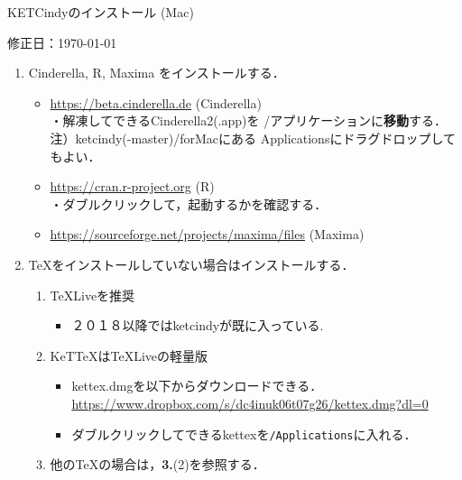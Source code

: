 \documentclass{ujarticle}
\begin{document}
\begin{center}
KETCindyのインストール (Mac)
\end{center}

\hfill 修正日：\today

\begin{enumerate}[\bf\large 1.]
\item Cinderella, R, Maxima をインストールする．
 \begin{itemize}
 \item \url{https://beta.cinderella.de}  (Cinderella)\\
\hspace*{1zw}・解凍してできるCinderella2(.app)を /アプリケーションに{\bf 移動}する．\\
\hspace*{2zw}注）ketcindy(-master)/forMacにある Applicationsにドラグドロップしてもよい．
 \item \url{https://cran.r-project.org}   (R)\\
\hspace*{1zw}・ダブルクリックして，起動するかを確認する．
 \item \url{https://sourceforge.net/projects/maxima/files}  (Maxima)%
 \end{itemize}
 
\item TeXをインストールしていない場合はインストールする．
 \begin{enumerate}[(1)]
 \item TeXLiveを推奨
    \begin{itemize}
    \item ２０１８以降ではketcindyが既に入っている.
    \end{itemize}
 \item KeTTeXはTeXLiveの軽量版
    \begin{itemize}
    \item kettex.dmgを以下からダウンロードできる．\\
    \hspace*{10mm}\url{https://www.dropbox.com/s/dc4inuk06t07g26/kettex.dmg?dl=0}
    \item ダブルクリックしてできるkettexを\verb|/Applications|に入れる．
    \end{itemize}
 \item 他のTeXの場合は，{\bf 3.}(2)を参照する．
 \end{enumerate}


\end{enumerate}
\end{document}
